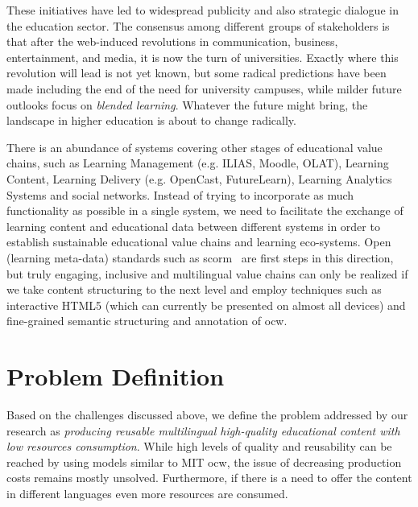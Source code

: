 \documentclass[PhD, Submit, ngerman,UKenglish,table]{scrbook}
\begin{document}
These initiatives have led to widespread publicity and also strategic dialogue in the education sector.
The consensus among different groups of stakeholders is that after the web-induced revolutions in communication, business, entertainment, and media, it is now the turn of universities.
Exactly where this revolution will lead is not yet known, but some radical predictions have been made including the end of the need for university campuses, while milder future outlooks focus on \emph{blended learning}.
Whatever the future might bring, the landscape in higher education is about to change radically.

There is an abundance of systems covering other stages of educational value chains, such as Learning Management (e.g. ILIAS, Moodle, OLAT), Learning Content, Learning Delivery (e.g. OpenCast, FutureLearn), Learning Analytics Systems and social networks.
Instead of trying to incorporate as much functionality as possible in a single system, we need to facilitate the exchange of learning content and educational data between different systems in order to establish sustainable educational value chains and learning eco-systems.
Open (learning meta-data) standards such as \gls{scorm}~\cite{scorm_specification2011} are first steps in this direction, but truly engaging, inclusive and multilingual value chains can only be realized if we take content structuring to the next level and employ techniques such as interactive HTML5 (which can currently be presented on almost all devices) and fine-grained semantic structuring and annotation of \gls{ocw}.


\section{Problem Definition}
\label{section:problem_definition}

Based on the challenges discussed above, we define the problem addressed by our research as \emph{producing reusable multilingual high-quality educational content with low resources consumption}.
While high levels of quality and reusability can be reached by using models similar to MIT \gls{ocw}, the issue of decreasing production costs remains mostly unsolved.
Furthermore, if there is a need to offer the content in different languages even more resources are consumed.
\end{document}
